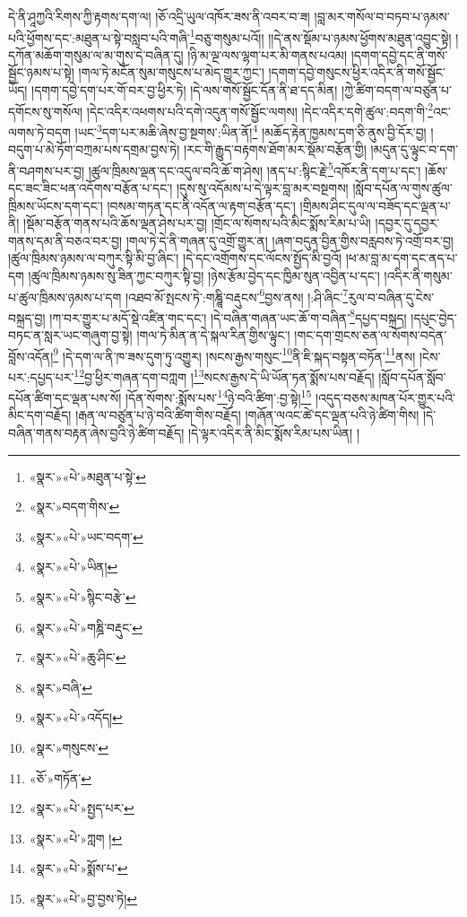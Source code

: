 དེ་ནི་ཤཱཀྱའི་རིགས་ཀྱི་རྟགས་དག་ལ། །ཅོ་འདྲི་ཡུལ་འཁོར་ཟས་ནི་འབར་བ་ཟ། །བླ་མར་གསོལ་བ་བཏབ་པ་ཉམས་པའི་ཕྱོགས་དང་:མཐུན་པ་སྟེ་བསླབ་པའི་གཞི་\footnote{«སྣར་»«པེ་»མཐུན་པ་སྟེ་}བཅུ་གསུམ་པའོ།། །།དེ་ནས་སྡོམ་པ་ཉམས་ཕྱོགས་མཐུན་འབྱུང་སྟེ། །དཀོན་མཆོག་གསུམ་ལ་མ་གུས་དེ་བཞིན་དུ། །ཉི་མ་ལྔ་ལས་ལྷག་པར་མི་གནས་པའམ། །དགག་དབྱེ་དང་ནི་གསོ་སྦྱོང་ཉམས་པ་སྟེ། །གལ་ཏེ་མངོན་སུམ་གསུངས་པ་མེད་གྱུར་ཀྱང་། །དགག་དབྱེ་གསུངས་ཕྱིར་འདིར་ནི་གསོ་སྦྱོང་ཡོད། །དགག་དབྱེ་དག་པར་གོ་བར་བྱ་ཕྱིར་ཏེ། །དེ་ལས་གསོ་སྦྱོང་དོན་ནི་ཐ་དད་མིན། །ཀྱེ་ཚིག་བདག་ལ་བཙུན་པ་དགོངས་སུ་གསོལ། །དེང་འདིར་འཕགས་པའི་དགེ་འདུན་གསོ་སྦྱོང་ལགས། །དེང་འདིར་དགེ་ཚུལ་:བདག་གི་\footnote{«སྣར་»བདག་གིས་}འང་ལགས་ཏེ་བདག །ཡང་\footnote{«སྣར་»«པེ་»ཡང་བདག་}དག་པར་མཆི་ཞེས་བྱ་སྔགས་:ཡིན་ནོ།\footnote{«སྣར་»«པེ་»ཡིན།} །མཆོད་རྟེན་ཁྱམས་དག་ཅི་ནུས་བྱི་དོར་བྱ། །བདུག་པ་མེ་ཏོག་བཀྲམ་པས་དགྲམ་བྱས་ཏེ། །རང་གི་རྒྱུད་བརྟགས་ཐོག་མར་སྡོམ་བརྩོན་གྱི། །མདུན་དུ་ལྟུང་བ་དག་ནི་བཤགས་པར་བྱ། །ཚུལ་ཁྲིམས་ལྡན་དང་འདུལ་བའི་ཆོ་ག་ཤེས། །ནད་པ་:སྙིང་རྗེ་\footnote{«སྣར་»«པེ་»སྙིང་བརྩེ་}འཁོར་ནི་དག་པ་དང་། །ཆོས་དང་ཟང་ཟིང་ཕན་འདོགས་བརྩོན་པ་དང་། །དུས་སུ་འདོམས་པ་དེ་ལྟར་བླ་མར་བསྔགས། །སློབ་དཔོན་ལ་གུས་ཚུལ་ཁྲིམས་ཡོངས་དག་དང་། །བསམ་གཏན་དང་ནི་འདོན་ལ་རྟག་བརྩོན་དང་། །གྲིམས་ཤིང་དུལ་ལ་བཟོད་དང་ལྡན་པ་ནི། །སྡོམ་བརྩོན་གནས་པའི་ཆོས་ལྡན་ཤེས་པར་བྱ། །གྲོང་ལ་སོགས་པའི་མིང་སྨོས་རིམ་པ་ཡི། །དབྱར་དུ་དབྱར་གནས་དམ་ནི་བཅའ་བར་བྱ། །གལ་ཏེ་དེ་ནི་གཞན་དུ་འགྲོ་གྱུར་ན། །ཞག་བདུན་བྱིན་གྱིས་བརླབས་ཏེ་འགྲོ་བར་བྱ། །ཚུལ་ཁྲིམས་ཉམས་ལ་བཀུར་སྟི་མི་བྱ་ཞིང་། །དེ་དང་འགྲོགས་དང་ལོངས་སྤྱོད་མི་བྱའོ། །ཕ་མ་བླ་མ་དག་དང་ནད་པ་དག །ཚུལ་ཁྲིམས་ཉམས་སུ་ཟིན་ཀྱང་བཀུར་སྟི་བྱ། །ཉེས་རྩོམ་བྱེད་དང་ཁྱིམ་སུན་འབྱིན་པ་དང་། །འདིར་ནི་གསུམ་པ་ཚུལ་ཁྲིམས་ཉམས་པ་དག །འཐབ་མོ་སྤངས་ཏེ་:གཎྜཱི་བརྡུངས་\footnote{«སྣར་»«པེ་»གཎྜི་བརྡུང་}བྱས་ནས། །:ཤི་ཞིང་\footnote{«སྣར་»«པེ་»ཆུ་ཤིང་}རུལ་བ་བཞིན་དུ་ངེས་བསྐྲད་བྱ། །ཀ་བར་གྱུར་པ་མདོ་སྡེ་འཛིན་གང་དང་། །དེ་བཞིན་གཞན་ཡང་ཆོ་ག་བཞིན་\footnote{«སྣར་»བཞི་}དཔྱད་བསྐྲད། །དཔུང་བྱེད་བཏང་ན་སླར་ཡང་གཞུག་བྱ་སྟེ། །གལ་ཏེ་མིན་ན་དེ་སྐལ་རིན་གྱིས་ལྟུང་། །གང་དག་གྲངས་ཅན་ལ་སོགས་བདེན་བློས་འདོན།\footnote{«སྣར་»«པེ་»འདོད།} །དེ་དག་ལ་ནི་ཁ་ཟས་དུག་ཏུ་འགྱུར། །སངས་རྒྱས་གསུང་\footnote{«སྣར་»གསུངས་}ནི་ཇི་སྐད་བསྟན་བཏོན་\footnote{«ཅོ་»གཏོན་}ནས། །ངེས་པར་:དཔྱད་པར་\footnote{«སྣར་»«པེ་»སྤྱད་པར་}བྱ་ཕྱིར་གཞན་དག་བཀླག །\footnote{«སྣར་»«པེ་»ཀླག །}སངས་རྒྱས་དེ་ཡི་ཡོན་ཏན་སྨོས་པས་བརྗོད། །སློབ་དཔོན་སློབ་དཔོན་ཚིག་དང་ལྡན་པས་སོ། །དོན་སོགས་:སྨོས་པས་\footnote{«སྣར་»«པེ་»སྨོས་པ་}ཉེ་བའི་ཚིག་:བྱ་སྟེ།\footnote{«སྣར་»«པེ་»བྱ་བྱས་ཏེ།} །འདུད་བཅས་མཁན་པོར་གྱུར་པའི་མིང་དག་བརྗོད། །རྒན་ལ་བཙུན་པ་ཉེ་བའི་ཚིག་གིས་བརྗོད། །གཞོན་ལའང་ཚེ་དང་ལྡན་པའི་ཉེ་ཚིག་གིས། །དེ་བཞིན་གནས་བརྟན་ཞེས་བྱའི་ཉེ་ཚིག་བརྗོད། །དེ་ལྟར་འདིར་ནི་མིང་སྨོས་རིམ་པས་ཡིན། །
